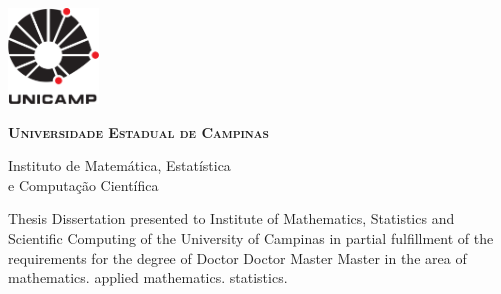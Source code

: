 \thispagestyle{plain}
\includegraphics[width=.94in, height=1in,
keepaspectratio=true]{figuras/unicamp-logo}
\begin{center}
  {\large\textbf{\textsc{Universidade Estadual de Campinas}}
  \vspace{.4cm}

  Instituto de Matemática, Estatística \\
  e Computação Científica}
\end{center}
\vspace{.01cm}
\begin{center}
  {\large\textbf{\textsc{\autor}}}
\end{center}
\vspace{.01cm}
\begin{center}
  {\Large\textbf{\textsc{\titulo}}}
\end{center}
\vspace{.01cm}
\begin{center}
  {\Large\textsl{\textsc{\titulopt}}}
\end{center}
\vspace{.01cm}

\begin{flushright}
  \begin{minipage}[c]{.5\textwidth}
    \ifx\mestrado\undefined
    Thesis
    \else
    Dissertation
    \fi
    presented to Institute of Mathematics, Statistics and Scientific Computing
    of the University of Campinas in partial
    fulfillment of the requirements for the degree of
    \ifx\mestrado\undefined
    \ifx\femaleAuthor\undefined
    Doctor
    \else
    Doctor
    \fi
    \else
    \ifx\femaleAuthor\undefined
    Master
    \else
    Master
    \fi
    \fi
    in the area of
    \ifx\matematica\undefined
    \else
    mathematics.
    \fi
    \ifx\aplicada\undefined
    \else
    applied mathematics.
    \fi
    \ifx\estatistica\undefined
    \else
    statistics.
    \fi
  \end{minipage}
\end{flushright}


